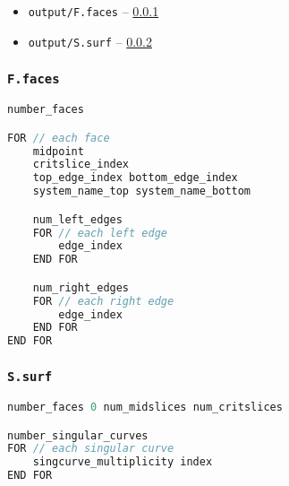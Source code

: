 \begin{itemize}
	\item {\tt output/F.faces} -- \ref{sec:f.faces}
	\item {\tt output/S.surf} -- \ref{sec:s.surf}
\end{itemize}

\subsubsection{\tt F.faces}
\label{sec:f.faces}
\begin{center}\begin{minipage}{0.9\linewidth}
\begin{lstlisting}[language=c++, caption={\tt output/F.faces}, captionpos=b]
number_faces

FOR // each face
	midpoint
	critslice_index
	top_edge_index bottom_edge_index
	system_name_top system_name_bottom

	num_left_edges
	FOR // each left edge
		edge_index
	END FOR

	num_right_edges
	FOR // each right edge
		edge_index
	END FOR
END FOR
\end{lstlisting}
\end{minipage}\end{center}

\subsubsection{\tt S.surf}
\label{sec:s.surf}

\begin{center}\begin{minipage}{0.9\linewidth}
\begin{lstlisting}[language=c++, caption={\tt output/S.surf}, captionpos=b]
number_faces 0 num_midslices num_critslices

number_singular_curves
FOR // each singular curve
	singcurve_multiplicity index
END FOR
\end{lstlisting}
\end{minipage}\end{center}





